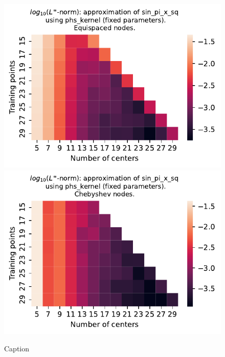 \documentclass[12pt]{report} %
\begin{document}
\begin{figure}[ht]
    \centering
    
    \includegraphics[width=.49\textwidth]{imagenes/experiments/1d/least_squares/opt-sin_pi_x_sq-Kphs_kernel-Equi.pdf}
    \includegraphics[width=.49\textwidth]{imagenes/experiments/1d/least_squares/opt-sin_pi_x_sq-Kphs_kernel-Cheb.pdf}
    \caption{Caption}
    \label{fig:opt-sin-pi-x-sq-phs}
\end{figure}



\end{document}
